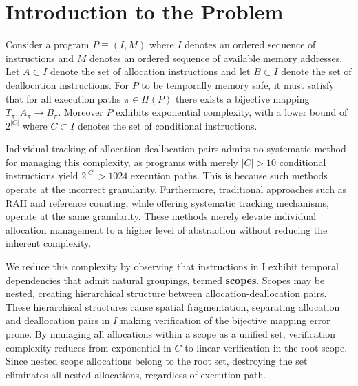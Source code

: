 \section{Introduction to the Problem}
\label{sec:Introduction-to-the-Problem}

Consider a program $P \equiv (I, M)$ where $I$ denotes an ordered sequence of instructions and $M$ denotes an ordered sequence of available memory addresses.
Let $A \subset I$ denote the set of allocation instructions and let $B \subset I$ denote
the set of deallocation instructions. For $P$ to be temporally memory safe, it must satisfy
that for all execution paths $\pi \in \Pi(P)$ there exists a bijective mapping $T_{\pi}: A_{\pi} \rightarrow B_{\pi}$. Moreover $P$ exhibits exponential complexity, with a lower bound of $2^{|C|}$ where $C \subset I$ denotes the set of conditional instructions.

Individual tracking of allocation-deallocation pairs admits no systematic method for managing this complexity, as programs with merely $|C| > 10$ conditional instructions yield $2^{|C|} > 1024$ execution paths. This is because such methods operate at the incorrect granularity. Furthermore, traditional approaches such as RAII and reference counting, while offering systematic tracking mechanisms, operate at the same granularity. These methods merely elevate individual allocation management to a higher level of abstraction without reducing the inherent complexity. 

We reduce this complexity by observing that instructions in I exhibit temporal dependencies that admit natural groupings, termed \textbf{scopes}. Scopes may be nested, creating hierarchical structure between allocation-deallocation pairs. These hierarchical structures cause spatial fragmentation, separating allocation and deallocation pairs in $I$ making verification of the bijective mapping error prone. By managing all allocations within a scope as a unified set, verification complexity reduces from exponential in $C$ to linear verification in the root scope. Since nested scope allocations belong to the root set, destroying the set eliminates all nested allocations, regardless of execution path.

\newpage
